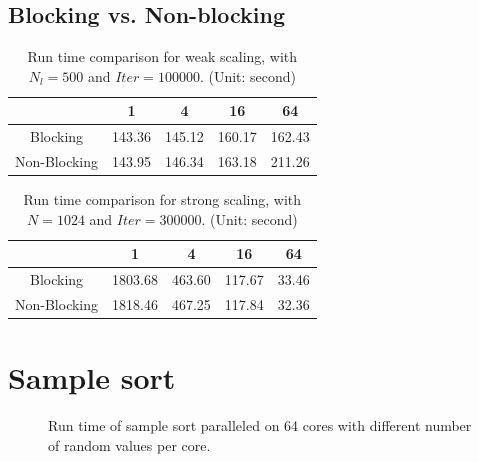 \documentclass[11pt, oneside]{article}   	%
\begin{document}
\subsection{Blocking vs. Non-blocking}
\begin{table}[h]
\centering
\caption{Run time comparison for weak scaling, with $N_l=500$ and $Iter= 100000$. (Unit: second)}
\begin{tabular}{|c|c|c|c|c|}
\hline
             & 1 & 4 & 16 & 64 \\ \hline
Blocking  &  143.36 &  145.12 & 160.17 &162.43    \\ \hline
Non-Blocking &  143.95&146.34&163.18&211.26   \\ \hline
\end{tabular}
\end{table}
\begin{table}[h]
\centering
\caption{Run time comparison for strong scaling, with $N=1024$ and $Iter= 300000$. (Unit: second)}
\begin{tabular}{|c|c|c|c|c|}
\hline
             & 1 & 4 & 16 & 64 \\ \hline
Blocking     &   1803.68 & 463.60 & 117.67 & 33.46    \\ \hline
Non-Blocking &   1818.46 & 467.25 &117.84 & 32.36    \\ \hline
\end{tabular}
\end{table}
\section{Sample sort}
\begin{figure}[ht]
\centering
{}
\caption{Run time of sample sort paralleled on 64 cores with different number of random values per core.}
\end{figure}
\end{document}
